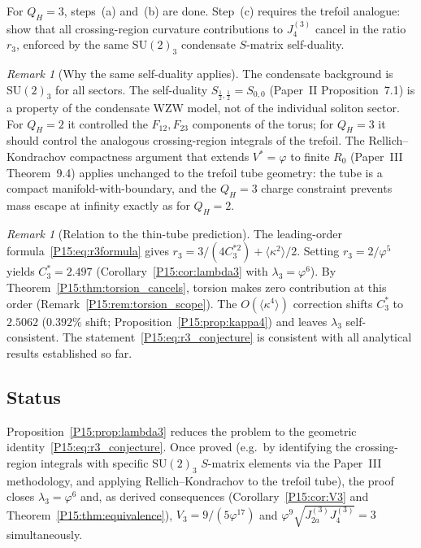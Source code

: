 \documentclass[11pt,a4paper]{article}
\theoremstyle{definition}\newtheorem{definition}[theorem]{Definition}
\theoremstyle{remark}
\newtheorem{remark}[theorem]{Remark}
\newcommand{\vp}{\varphi}
\newcommand{\lam}{\lambda}
\newcommand{\Ja}{J_{2a}}
\newcommand{\Jfour}{J_4}
\newcommand{\SU}{\mathrm{SU}}
\newcommand{\QH}{Q_H}
\begin{document}
For $\QH=3$, steps~(a) and~(b) are done.
Step~(c) requires the trefoil analogue: show that all
crossing-region curvature contributions to $J_4^{(3)}$ cancel
in the ratio $r_3$, enforced by the same $\SU(2)_3$ condensate
$S$-matrix self-duality.

\begin{remark}[Why the same self-duality applies]
\label{P15:rem:why_same_self_duality}
The condensate background is $\SU(2)_3$ for all sectors.
The self-duality $S_{\frac12,\frac12}=S_{0,0}$
(Paper~II Proposition~7.1) is a property of the condensate WZW model,
not of the individual soliton sector.
For $\QH=2$ it controlled the $F_{12},F_{23}$ components of the
torus; for $\QH=3$ it should control the analogous crossing-region
integrals of the trefoil.
The Rellich--Kondrachov compactness argument that extends
$V^*=\vp$ to finite $R_0$ (Paper~III Theorem~9.4) applies unchanged
to the trefoil tube geometry: the tube is a compact
manifold-with-boundary, and the $\QH=3$ charge constraint prevents
mass escape at infinity exactly as for $\QH=2$.
\end{remark}

\begin{remark}[Relation to the thin-tube prediction]
\label{P15:rem:thin_tube_relation}
The leading-order formula~\eqref{P15:eq:r3formula} gives
$r_3 = 3/(4C_3^{*2})+\langle\kappa^2\rangle/2$.
Setting $r_3=2/\vp^5$ yields $C_3^*=2.497$
(Corollary~\ref{P15:cor:lambda3} with $\lam_3=\vp^6$).
By Theorem~\ref{P15:thm:torsion_cancels}, torsion makes zero
contribution at this order (Remark~\ref{P15:rem:torsion_scope}).
The $O(\langle\kappa^4\rangle)$ correction shifts $C_3^*$ to
$2.5062$ ($0.392\%$ shift; Proposition~\ref{P15:prop:kappa4}) and
leaves $\lam_3$ self-consistent.
The statement~\eqref{P15:eq:r3_conjecture} is consistent with all
analytical results established so far.
\end{remark}

\subsection{Status}

Proposition~\ref{P15:prop:lambda3} reduces the problem
to the geometric identity~\eqref{P15:eq:r3_conjecture}.
Once proved (e.g.\ by identifying the crossing-region integrals
with specific $\SU(2)_3$ $S$-matrix elements via the Paper~III
methodology, and applying Rellich--Kondrachov to the trefoil tube),
the proof closes $\lam_3=\vp^6$ and, as derived consequences
(Corollary~\ref{P15:cor:V3} and Theorem~\ref{P15:thm:equivalence}),
$V_3=9/(5\vp^{17})$ and $\vp^9\sqrt{\Ja^{(3)}\Jfour^{(3)}}=3$
simultaneously.
\end{document}

